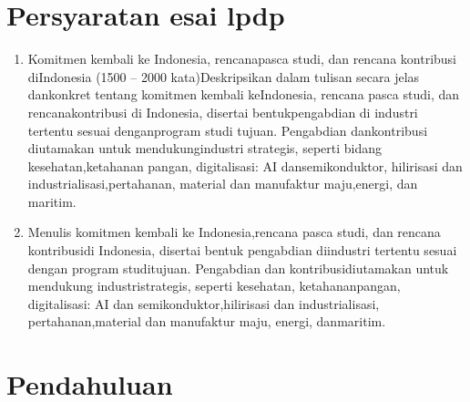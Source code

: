 \documentclass[../esai.tex]{subfiles}
\begin{document}
\section{Persyaratan esai lpdp}%
\label{sec:Persyaratan esai lpdp}

\begin{enumerate}
	\item Komitmen kembali ke Indonesia, rencanapasca studi, dan rencana kontribusi diIndonesia (1500 – 2000 kata)Deskripsikan dalam tulisan secara jelas dankonkret tentang komitmen kembali keIndonesia, rencana pasca studi, dan rencanakontribusi di Indonesia, disertai bentukpengabdian di industri tertentu sesuai denganprogram studi tujuan. Pengabdian dankontribusi diutamakan untuk mendukungindustri strategis, seperti bidang kesehatan,ketahanan pangan, digitalisasi: AI dansemikonduktor, hilirisasi dan industrialisasi,pertahanan, material dan manufaktur maju,energi, dan maritim.
	\item Menulis komitmen kembali ke Indonesia,rencana pasca studi, dan rencana kontribusidi Indonesia, disertai bentuk pengabdian diindustri tertentu sesuai dengan program studitujuan. Pengabdian dan kontribusidiutamakan untuk mendukung industristrategis, seperti kesehatan, ketahananpangan, digitalisasi: AI dan semikonduktor,hilirisasi dan industrialisasi, pertahanan,material dan manufaktur maju, energi, danmaritim.
\end{enumerate}



\section{Pendahuluan}%
\label{sec:Pendahuluan}




\end{document}
